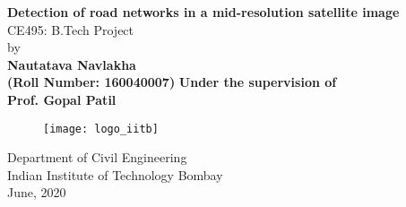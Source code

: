 \begin{titlepage}
  \vspace{3 cm}
  \begin{center}
  \large{\textbf{Detection of road networks in a mid-resolution satellite image}}\bigskip \\
  
  \vspace{3mm}
  \vfill
  CE495: B.Tech Project \\
  by \bigskip \\
  \textbf{Nautatava Navlakha\\(Roll Number: 160040007)}
  \vfill
  \textbf{Under the supervision of}\\
  \textbf{Prof. Gopal Patil}\\
\vfill  \begin{figure}[h]
  \texttt{[image: logo\_iitb]}
  \centering
  \end{figure}
  \vfill
  \large
  
Department of Civil Engineering\\
Indian Institute of Technology Bombay\\
June, 2020
\end{center}
\vfill %
\end{titlepage}
